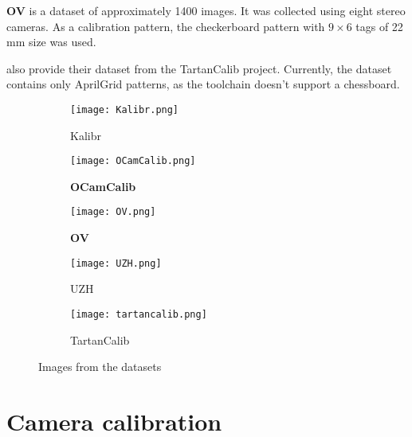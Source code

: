 \textbf{OV} \citep{lochmanBabelCalibUniversalApproach2021} is a dataset of
approximately 1400 images. It was collected using eight stereo cameras.
As a calibration pattern, the checkerboard pattern with \(9\times 6\) tags of 22 mm size
was used.

\textcite{duisterhofTartanCalibIterativeWideAngle2022} also provide their
dataset from the TartanCalib project. Currently, the dataset contains only
AprilGrid patterns, as the toolchain doesn't support a chessboard.

\begin{figure}[h]
	\centering
	\begin{subfigure}[b]{0.3\linewidth}
		\texttt{[image: Kalibr.png]}
		\caption{Kalibr}
	\end{subfigure}
	\hfill
	\begin{subfigure}[b]{0.3\linewidth}
		\texttt{[image: OCamCalib.png]}
		\caption{\textbf{OCamCalib}}
	\end{subfigure}
	\hfill
	\begin{subfigure}[b]{0.3\linewidth}
		\texttt{[image: OV.png]}
		\caption{\textbf{OV}}
	\end{subfigure}
	\begin{subfigure}[b]{0.3\linewidth}
		\texttt{[image: UZH.png]}
		\caption{UZH}
	\end{subfigure}
	\begin{subfigure}[b]{0.3\linewidth}
		\texttt{[image: tartancalib.png]}
		\caption{TartanCalib}
	\end{subfigure}
	\caption{Images from the datasets}
\end{figure}

\section{Camera calibration}\label{sec:camera_calibration_exp}


